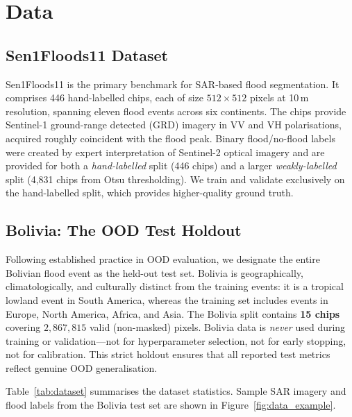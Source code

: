 \documentclass[12pt]{article}
\begin{document}
\section{Data}
\label{sec:data}

\subsection{Sen1Floods11 Dataset}

Sen1Floods11 \cite{bonafilia2020sen1floods11} is the primary benchmark for
SAR-based flood segmentation.  It comprises 446 hand-labelled chips, each of
size $512 \times 512$ pixels at 10\,m resolution, spanning eleven flood events
across six continents.  The chips provide Sentinel-1 ground-range detected
(GRD) imagery in VV and VH polarisations, acquired roughly coincident with
the flood peak.  Binary flood/no-flood labels were created by expert
interpretation of Sentinel-2 optical imagery and are provided for both a
\emph{hand-labelled} split (446 chips) and a larger \emph{weakly-labelled}
split (4{,}831 chips from Otsu thresholding).  We train and validate
exclusively on the hand-labelled split, which provides higher-quality ground
truth.

\subsection{Bolivia: The OOD Test Holdout}

Following established practice in OOD evaluation, we designate the entire
Bolivian flood event as the held-out test set.  Bolivia is geographically,
climatologically, and culturally distinct from the training events: it is a
tropical lowland event in South America, whereas the training set includes
events in Europe, North America, Africa, and Asia.  The Bolivia split contains
\textbf{15 chips} covering $2{,}867{,}815$ valid (non-masked) pixels.
Bolivia data is \emph{never} used during training or validation—not for
hyperparameter selection, not for early stopping, not for calibration.
This strict holdout ensures that all reported test metrics reflect genuine
OOD generalisation.

Table~\ref{tab:dataset} summarises the dataset statistics.  Sample SAR imagery
and flood labels from the Bolivia test set are shown in Figure~\ref{fig:data_example}.
\end{document}

